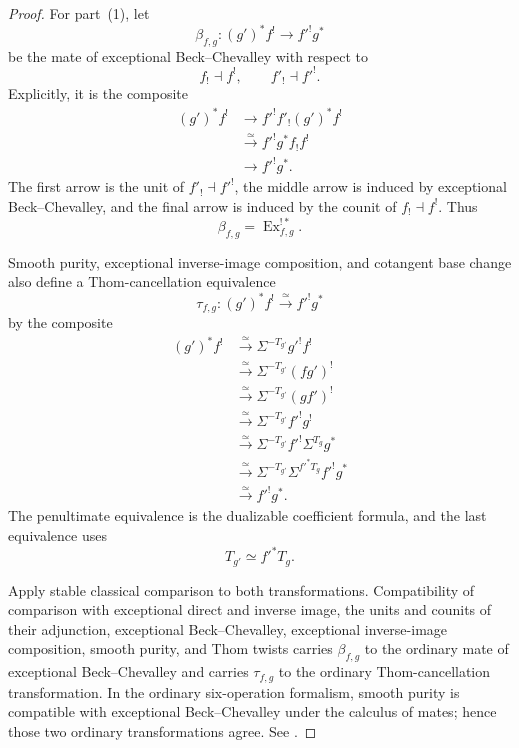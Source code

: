 \begin{proof}
For part~(1), let
\[
    \beta_{f,g}:
    (g')^*f^!
    \longrightarrow
    f'^!g^*
\]
be the mate of exceptional Beck--Chevalley with respect to
\[
    f_!\dashv f^!,
    \qquad
    f'_!\dashv f'^!.
\]
Explicitly, it is the composite
\[
\begin{aligned}
    (g')^*f^!
    &\longrightarrow
    f'^!f'_!(g')^*f^! \\
    &\xrightarrow{\simeq}
    f'^!g^*f_!f^! \\
    &\longrightarrow
    f'^!g^*.
\end{aligned}
\]
The first arrow is the unit of \(f'_!\dashv f'^!\), the middle arrow is
induced by exceptional Beck--Chevalley, and the final arrow is induced by
the counit of \(f_!\dashv f^!\).  Thus
\[
    \beta_{f,g}
    =
    \operatorname{Ex}^{!*}_{f,g}.
\]

Smooth purity, exceptional inverse-image composition, and cotangent base
change also define a Thom-cancellation equivalence
\[
    \tau_{f,g}:
    (g')^*f^!
    \xrightarrow{\simeq}
    f'^!g^*
\]
by the composite
\[
\begin{aligned}
    (g')^*f^!
    &\xrightarrow{\simeq}
    \Sigma^{-T_{g'}}g'^!f^! \\
    &\xrightarrow{\simeq}
    \Sigma^{-T_{g'}}(fg')^! \\
    &\xrightarrow{\simeq}
    \Sigma^{-T_{g'}}(gf')^! \\
    &\xrightarrow{\simeq}
    \Sigma^{-T_{g'}}f'^!g^! \\
    &\xrightarrow{\simeq}
    \Sigma^{-T_{g'}}f'^!\Sigma^{T_g}g^* \\
    &\xrightarrow{\simeq}
    \Sigma^{-T_{g'}}\Sigma^{f'^*T_g}f'^!g^* \\
    &\xrightarrow{\simeq}
    f'^!g^*.
\end{aligned}
\]
The penultimate equivalence is the dualizable coefficient formula, and the
last equivalence uses
\[
    T_{g'}
    \simeq
    f'^*T_g.
\]

Apply stable classical comparison to both transformations.  Compatibility
of comparison with exceptional direct and inverse image, the units and
counits of their adjunction, exceptional Beck--Chevalley, exceptional
inverse-image composition, smooth purity, and Thom twists carries
\(\beta_{f,g}\) to the ordinary mate of exceptional Beck--Chevalley and
carries \(\tau_{f,g}\) to the ordinary Thom-cancellation transformation.
In the ordinary six-operation formalism, smooth purity is compatible with
exceptional Beck--Chevalley under the calculus of mates; hence those two
ordinary transformations agree.  See
\cite{HoyoisSixOperations}.


\end{proof}
